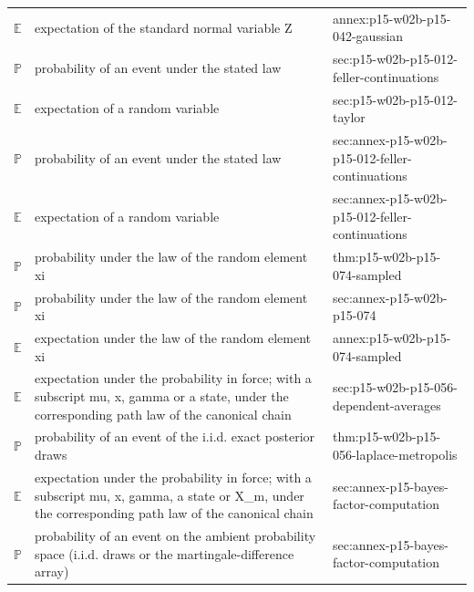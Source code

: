 \begin{longtable}{@{}p{}p{}p{}@{}}
\(\mathbb E\) & expectation of the standard normal variable Z & annex:\allowbreak{}p15-\allowbreak{}w02b-\allowbreak{}p15-\allowbreak{}042-\allowbreak{}gaussian \\
\(\mathbb P\) & probability of an event under the stated law & sec:\allowbreak{}p15-\allowbreak{}w02b-\allowbreak{}p15-\allowbreak{}012-\allowbreak{}feller-\allowbreak{}continuations \\
\(\mathbb E\) & expectation of a random variable & sec:\allowbreak{}p15-\allowbreak{}w02b-\allowbreak{}p15-\allowbreak{}012-\allowbreak{}taylor \\
\(\mathbb P\) & probability of an event under the stated law & sec:\allowbreak{}annex-\allowbreak{}p15-\allowbreak{}w02b-\allowbreak{}p15-\allowbreak{}012-\allowbreak{}feller-\allowbreak{}continuations \\
\(\mathbb E\) & expectation of a random variable & sec:\allowbreak{}annex-\allowbreak{}p15-\allowbreak{}w02b-\allowbreak{}p15-\allowbreak{}012-\allowbreak{}feller-\allowbreak{}continuations \\
\(\mathbb P\) & probability under the law of the random element xi & thm:\allowbreak{}p15-\allowbreak{}w02b-\allowbreak{}p15-\allowbreak{}074-\allowbreak{}sampled \\
\(\mathbb P\) & probability under the law of the random element xi & sec:\allowbreak{}annex-\allowbreak{}p15-\allowbreak{}w02b-\allowbreak{}p15-\allowbreak{}074 \\
\(\mathbb E\) & expectation under the law of the random element xi & annex:\allowbreak{}p15-\allowbreak{}w02b-\allowbreak{}p15-\allowbreak{}074-\allowbreak{}sampled \\
\(\mathbb E\) & expectation under the probability in force; with a subscript mu, x, gamma or a state, under the corresponding path law of the canonical chain & sec:\allowbreak{}p15-\allowbreak{}w02b-\allowbreak{}p15-\allowbreak{}056-\allowbreak{}dependent-\allowbreak{}averages \\
\(\mathbb P\) & probability of an event of the i.i.d. exact posterior draws & thm:\allowbreak{}p15-\allowbreak{}w02b-\allowbreak{}p15-\allowbreak{}056-\allowbreak{}laplace-\allowbreak{}metropolis \\
\(\mathbb E\) & expectation under the probability in force; with a subscript mu, x, gamma, a state or X\_m, under the corresponding path law of the canonical chain & sec:\allowbreak{}annex-\allowbreak{}p15-\allowbreak{}bayes-\allowbreak{}factor-\allowbreak{}computation \\
\(\mathbb P\) & probability of an event on the ambient probability space (i.i.d. draws or the martingale-difference array) & sec:\allowbreak{}annex-\allowbreak{}p15-\allowbreak{}bayes-\allowbreak{}factor-\allowbreak{}computation \\

\end{longtable}
